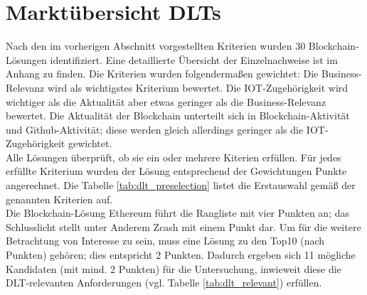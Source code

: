 %
%
\section{Marktübersicht DLTs}
\label{sec:dlt_selection:market}
Nach den im vorherigen Abschnitt vorgestellten Kriterien wurden 30 Blockchain-Lösungen identifiziert. Eine detaillierte Übersicht der Einzelnachweise ist im Anhang zu finden. Die Kriterien wurden folgendermaßen gewichtet: Die Business-Relevanz wird als wichtigstes Kriterium bewertet. Die IOT-Zugehörigkeit wird wichtiger als die Aktualität aber etwas geringer als die Business-Relevanz bewertet. Die Aktualität der Blockchain unterteilt sich in Blockchain-Aktivität und Github-Aktivität; diese werden gleich allerdings geringer als die IOT-Zugehörigkeit gewichtet.\\
Alle Lösungen überprüft, ob sie ein oder mehrere Kiterien erfüllen. Für jedes erfüllte Kriterium wurden der Lösung entsprechend der Gewichtungen Punkte angerechnet. Die Tabelle \ref{tab:dlt_preselection} listet die Erstauswahl gemäß der genannten Kriterien auf.\\
Die Blockchain-Lösung Ethereum führt die Rangliste mit vier Punkten an; das Schlusslicht stellt unter Anderem Zcash mit einem Punkt dar. Um für die weitere Betrachtung von Interesse zu sein, muss eine Lösung zu den Top10 (nach Punkten) gehören; dies entspricht 2 Punkten. Dadurch ergeben sich 11 mögliche Kandidaten (mit mind. 2 Punkten) für die Untersuchung, inwieweit diese die \ac{DLT}-relevanten Anforderungen (vgl. Tabelle \ref{tab:dlt_relevant}) erfüllen.

